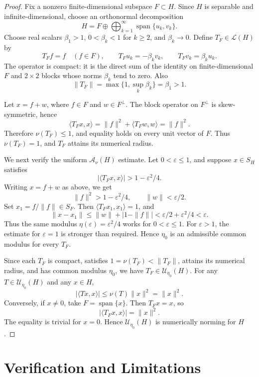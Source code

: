 \documentclass[11pt]{article}
\newcommand{\Anu}{\mathcal A_{\nu}}
\newcommand{\Lcal}{\mathcal L}
\begin{document}
\begin{proof}
Fix a nonzero finite-dimensional subspace \(F\subset H\). Since \(H\) is separable and infinite-dimensional, choose an orthonormal decomposition
\[
H=F\oplus \bigoplus_{k=1}^{\infty} \operatorname{span}\{u_k,v_k\}.
\]
Choose real scalars \(\beta_1>1\), \(0<\beta_k<1\) for \(k\ge2\), and \(\beta_k\to0\). Define \(T_F\in\Lcal(H)\) by
\[
T_F f=f\quad(f\in F),\qquad
T_Fu_k=-\beta_k v_k,\qquad
T_Fv_k=\beta_k u_k .
\]
The operator is compact: it is the direct sum of the identity on finite-dimensional \(F\) and \(2\times2\) blocks whose norms \(\beta_k\) tend to zero. Also
\[
\|T_F\|=\max\{1,\sup_k\beta_k\}=\beta_1>1.
\]

Let \(x=f+w\), where \(f\in F\) and \(w\in F^\perp\). The block operator on \(F^\perp\) is skew-symmetric, hence
\[
\langle T_Fx,x\rangle=\|f\|^2+\langle T_Fw,w\rangle=\|f\|^2.
\]
Therefore \(\nu(T_F)\le1\), and equality holds on every unit vector of \(F\). Thus \(\nu(T_F)=1\), and \(T_F\) attains its numerical radius.

We next verify the uniform \(\Anu(H)\) estimate. Let \(0<\varepsilon\le1\), and suppose \(x\in S_H\) satisfies
\[
|\langle T_Fx,x\rangle|>1-\varepsilon^2/4.
\]
Writing \(x=f+w\) as above, we get
\[
\|f\|^2>1-\varepsilon^2/4,\qquad \|w\|<\varepsilon/2.
\]
Set \(x_1=f/\|f\|\in S_F\). Then \(\langle T_Fx_1,x_1\rangle=1\), and
\[
\|x-x_1\|\le \|w\|+\left|1-\|f\|\right|
<\varepsilon/2+\varepsilon^2/4<\varepsilon .
\]
Thus the same modulus \(\eta(\varepsilon)=\varepsilon^2/4\) works for
\(0<\varepsilon\le1\).  For \(\varepsilon>1\), the estimate for
\(\varepsilon=1\) is stronger than required.  Hence \(\eta_0\) is an admissible
common modulus for every \(T_F\).

Since each \(T_F\) is compact, satisfies \(1=\nu(T_F)<\|T_F\|\), attains its
numerical radius, and has common modulus \(\eta_0\), we have
\(T_F\in\mathscr U_{\eta_0}(H)\).  For any \(T\in\mathscr U_{\eta_0}(H)\) and
any \(x\in H\),
\[
|\langle Tx,x\rangle|\le \nu(T)\|x\|^2=\|x\|^2.
\]
Conversely, if \(x\neq0\), take \(F=\operatorname{span}\{x\}\). Then \(T_Fx=x\), so
\[
|\langle T_Fx,x\rangle|=\|x\|^2.
\]
The equality is trivial for \(x=0\). Hence \(\mathscr U_{\eta_0}(H)\) is
numerically norming for \(H\).
\end{proof}

\section*{Verification and Limitations}
\end{document}
